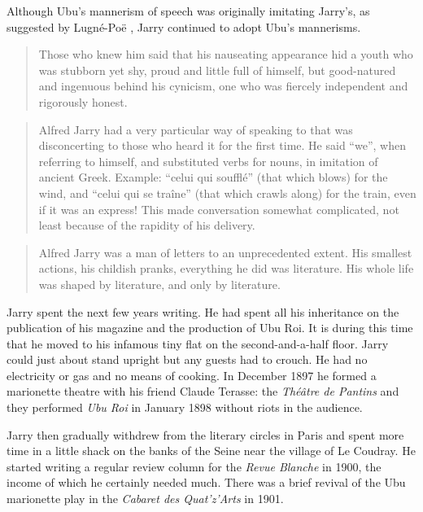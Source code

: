 Although Ubu's mannerism of speech was originally imitating Jarry's, as suggested by Lugné-Poë \autocite{Brotchie2011a}, Jarry continued to adopt Ubu's mannerisms.

\begin{quotation}
  Those who knew him said that his nauseating appearance hid a youth who was stubborn yet shy, proud and little full of himself, but good-natured and ingenuous behind his cynicism, one who was fiercely independent and rigorously honest. 
\end{quotation}

\begin{quotation}
  Alfred Jarry had a very particular way of speaking to that was disconcerting to those who heard it for the first time. He said ``we'', when referring to himself, and substituted verbs for nouns, in imitation of ancient Greek. Example: ``celui qui soufflé'' (that which blows) for the wind, and ``celui qui se traîne'' (that which crawls along) for the train, even if it was an express! This made conversation somewhat complicated, not least because of the rapidity of his delivery. 
\end{quotation}

\begin{quotation}
  Alfred Jarry was a man of letters to an unprecedented extent. His smallest actions, his childish pranks, everything he did was literature. His whole life was shaped by literature, and only by literature. 
\end{quotation}

Jarry spent the next few years writing. He had spent all his inheritance on the publication of his magazine and the production of Ubu Roi. It is during this time that he moved to his infamous tiny flat on the second-and-a-half floor. Jarry could just about stand upright but any guests had to crouch. He had no electricity or gas and no means of cooking. In December 1897 he formed a marionette theatre with his friend Claude Terasse: the \textit{Théâtre de Pantins} and they performed \textit{Ubu Roi} in January 1898 without riots in the audience.

Jarry then gradually withdrew from the literary circles in Paris and spent more time in a little shack on the banks of the Seine near the village of Le Coudray. He started writing a regular review column for the \textit{Revue Blanche} in 1900, the income of which he certainly needed much. There was a brief revival of the Ubu marionette play in the \textit{Cabaret des Quat'z'Arts} in 1901.

